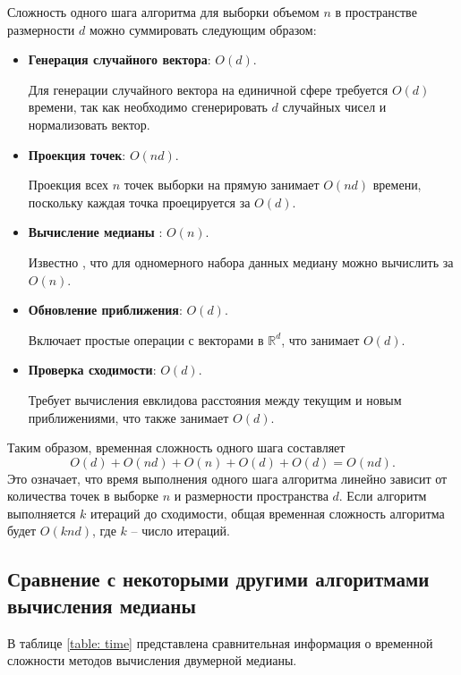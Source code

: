 \documentclass[specialist,
substylefile = spbu.rtx,
               subf,href,colorlinks=true, 12pt]{disser}
\begin{document}
Сложность одного шага алгоритма для выборки объемом $n$ в пространстве размерности $d$ можно суммировать следующим образом:

\begin{itemize}
    \item \textbf{Генерация случайного вектора}: $O(d)$.

    Для генерации случайного вектора на единичной сфере требуется $O(d)$ времени, так как необходимо сгенерировать $d$ случайных чисел и нормализовать вектор.
    
    \item \textbf{Проекция точек}: $O(nd)$.

    Проекция всех $n$ точек выборки на прямую занимает $O(nd)$ времени, поскольку каждая точка проецируется за $O(d)$.
    
    \item \textbf{Вычисление медианы} : $O(n)$.
    
    Известно \cite{aho1974design}, что для одномерного набора данных медиану можно вычислить за $O(n)$.
    
    \item \textbf{Обновление приближения}: $O(d)$.

    Включает простые операции с векторами в $\mathbb{R}^d$, что занимает $O(d)$.
 
    \item \textbf{Проверка сходимости}: $O(d)$.

    Требует вычисления евклидова расстояния между текущим и новым приближениями, что также занимает  $O(d)$.
\end{itemize}

Таким образом, временная сложность одного шага составляет
\begin{equation}
O(d)+O(nd)+O(n)+O(d)+O(d)=O(nd).
\label{eq:time_comp}
\end{equation}
Это означает, что время выполнения одного шага алгоритма линейно зависит от количества точек в выборке $n$ и размерности пространства $d$. Если алгоритм выполняется $k$ итераций до сходимости, общая временная сложность алгоритма будет $O(knd)$, где $k$ -- число итераций.

\subsection{Сравнение с некоторыми другими алгоритмами вычисления медианы}

В таблице \ref{table: time} представлена сравнительная информация о временной сложности методов вычисления двумерной медианы.
\end{document}
